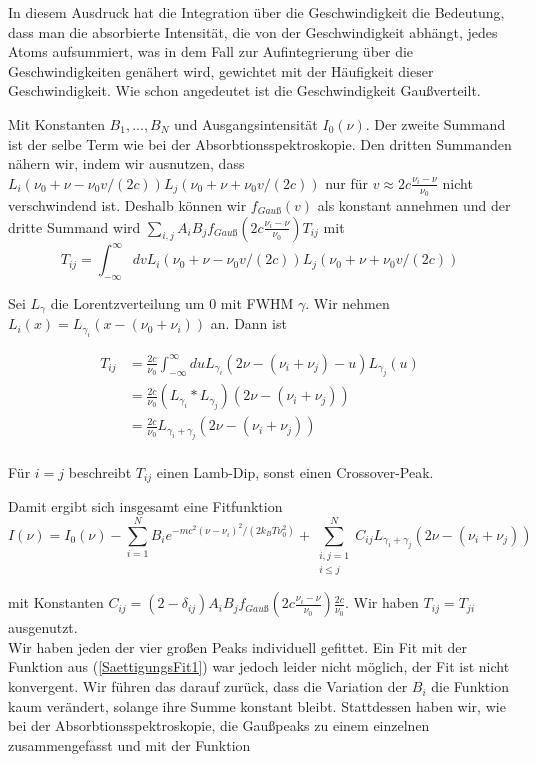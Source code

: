 \documentclass[a4paper,parskip]{scrartcl}
\begin{document}
In diesem Ausdruck hat die Integration über die Geschwindigkeit die Bedeutung, dass man die absorbierte Intensität, die von der Geschwindigkeit abhängt, jedes Atoms aufsummiert, was in dem Fall zur Aufintegrierung über die Geschwindigkeiten genähert wird, gewichtet mit der Häufigkeit dieser Geschwindigkeit. Wie schon angedeutet ist die Geschwindigkeit Gaußverteilt.

Mit Konstanten $B_1, ..., B_N$ und Ausgangsintensität $I_0(\nu)$. Der zweite Summand ist der selbe Term wie bei der Absorbtionsspektroskopie. Den dritten Summanden nähern wir, indem wir ausnutzen, dass  $L_i(\nu_0+\nu-\nu_0 v/(2c)) L_j(\nu_0+\nu+\nu_0 v/(2c))$ nur für $v \approx 2c \frac{\nu_i-\nu}{\nu_0}$ nicht verschwindend ist. Deshalb können wir $f_{Gauß}(v)$ als konstant annehmen und der dritte Summand wird $\sum_{i,j} A_iB_j f_{Gauß}(2c \frac{\nu_i-\nu}{\nu_0}) T_{ij}$ mit
$$T_{ij}=\int_{-\infty}^\infty dv L_i(\nu_0+\nu-\nu_0 v/(2c)) L_j(\nu_0+\nu+\nu_0 v/(2c))$$


Sei $L_\gamma$ die Lorentzverteilung um 0 mit FWHM $\gamma$. Wir nehmen $L_i(x) = L_{\gamma_i}(x-(\nu_0+\nu_i))$ an. Dann ist

\begin{align*}
T_{ij} &= \frac{2c}{\nu_0}\int_{-\infty}^\infty du L_{\gamma_i}(2\nu-(\nu_i+\nu_j)-u)L_{\gamma_j}(u)\\
&= \frac{2c}{\nu_0} (L_{\gamma_i} * L_{\gamma_j})(2\nu-(\nu_i+\nu_j)) \\
&= \frac{2c}{\nu_0} L_{\gamma_i+\gamma_j}(2\nu-(\nu_i+\nu_j)) \\
\end{align*}

Für $i=j$ beschreibt $T_{ij}$ einen Lamb-Dip, sonst einen Crossover-Peak. 

Damit ergibt sich insgesamt eine Fitfunktion
\begin{equation}
I(\nu) = I_0(\nu)-\sum_{i=1}^N B_i e^{-mc^2(\nu-\nu_i)^2/(2k_BT\nu_0^2)} +\sum_{\substack{i,j=1\\i\leq j}}^N C_{ij} L_{\gamma_i+\gamma_j}(2\nu-(\nu_i+\nu_j))
\label{SaettigungsFit1}
\end{equation}


mit Konstanten $C_{ij} = (2-\delta_{ij})A_iB_jf_{Gauß}(2c \frac{\nu_i-\nu}{\nu_0})\frac{2c}{\nu_0}$. Wir haben $T_{ij}=T_{ji}$ ausgenutzt.\\

Wir haben jeden der vier großen Peaks individuell gefittet. Ein Fit mit der Funktion aus (\ref{SaettigungsFit1}) war jedoch leider nicht möglich, der Fit ist nicht konvergent. Wir führen das darauf zurück, dass die Variation der $B_i$ die Funktion kaum verändert, solange ihre Summe konstant bleibt. Stattdessen haben wir, wie bei der Absorbtionsspektroskopie, die Gaußpeaks zu einem einzelnen zusammengefasst und mit der Funktion
\end{document}
